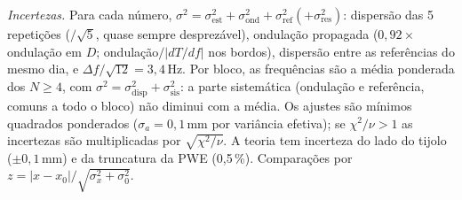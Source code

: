 \documentclass[10pt,twocolumn,a4paper]{article}
\begin{document}
\emph{Incertezas.} Para cada número, $\sigma^2=\sigma_\text{est}^2+\sigma_\text{ond}^2+\sigma_\text{ref}^2
(+\sigma_\text{res}^2)$: dispersão das 5 repetições ($/\sqrt5$, quase sempre desprezável), ondulação
propagada ($0{,}92\times$ondulação em $D$; ondulação$/|dT/df|$ nos bordos), dispersão entre as
referências do mesmo dia, e $\Delta f/\sqrt{12}=3{,}4$\,Hz. Por bloco, as frequências são a média
ponderada dos $N\ge4$, com $\sigma^2=\sigma_\text{disp}^2+\sigma_\text{sis}^2$: a parte sistemática
(ondulação e referência, comuns a todo o bloco) não diminui com a média.
Os ajustes são mínimos quadrados ponderados ($\sigma_a=0{,}1$\,mm por variância efetiva); se
$\chi^2/\nu>1$ as incertezas são multiplicadas por $\sqrt{\chi^2/\nu}$. A teoria tem incerteza do lado
do tijolo ($\pm0{,}1$\,mm) e da truncatura da PWE (0,5\,\%). Comparações por
$z=|x-x_0|/\sqrt{\sigma_x^2+\sigma_0^2}$.

\end{document}
